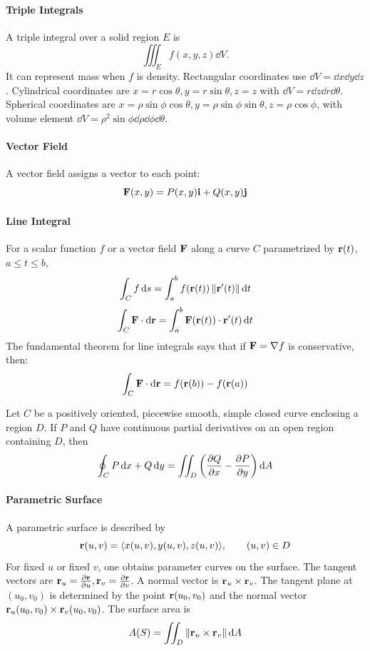 \documentclass[oneside]{book}
\begin{document}
\paragraph{Triple Integrals}

A triple integral over a solid region $E$ is
\[
    \iiint_E f(x,y,z)\dd V.
\]
It can represent mass when $f$ is density. Rectangular coordinates use
$
\dd V=\dd x\dd y\dd z
$.
Cylindrical coordinates are
$
    x=r\cos\theta,
    y=r\sin\theta,
    z=z
$
with
$\dd V=r\dd z\dd r\dd\theta$. Spherical coordinates are
$
    x=\rho\sin\phi\cos\theta,
    y=\rho\sin\phi\sin\theta,
    z=\rho\cos\phi
$,
with volume element
$
    \dd V=\rho^2\sin\phi\dd\rho\dd\phi\dd\theta
$.

\paragraph{Vector Field} A vector field assigns a vector to each point:
\[
    \mathbf{F}(x,y)=P(x,y)\mathbf{i}+Q(x,y)\mathbf{j}
\]

\paragraph{Line Integral}
For a scalar function $f$ or a vector field $\mathbf{F}$ along a curve $C$ parametrized by $\mathbf{r}(t)$, $a\leq t\leq b$,
\[
    \int_C f\mathop{}\!\mathrm{d} s=\int_a^b f(\mathbf{r}(t))\left\lVert \mathbf{r}'(t) \right\rVert\mathop{}\!\mathrm{d} t
\]
\[
    \int_C \mathbf{F}\cdot \mathop{}\!\mathrm{d} \mathbf{r}
    =\int_a^b \mathbf{F}(\mathbf{r}(t))\cdot \mathbf{r}'(t)\mathop{}\!\mathrm{d} t
\]
The fundamental theorem for line integrals says that if $\mathbf{F}=\nabla f$ is conservative, then:
\[
    \int_C \mathbf{F}\cdot \mathop{}\!\mathrm{d}\mathbf{r}=f(\mathbf{r}(b))-f(\mathbf{r}(a))
\]


\begin{theorem}
Let $C$ be a positively oriented, piecewise smooth, simple closed curve enclosing a region $D$. If $P$ and $Q$ have continuous partial derivatives on an open region containing $D$, then
\[
    \oint_C P\mathop{}\!\mathrm{d} x+Q\mathop{}\!\mathrm{d} y
    =\iint_D\left(\frac{\partial Q}{\partial x}-\frac{\partial P}{\partial y}\right)\mathop{}\!\mathrm{d} A
\]
\end{theorem}

\paragraph{Parametric Surface}

A parametric surface is described by
\[
    \mathbf{r}(u,v)=\langle x(u,v),y(u,v),z(u,v)\rangle,
    \qquad (u,v)\in D
\]
For fixed $u$ or fixed $v$, one obtains parameter curves on the surface. The tangent vectors are
$
    \mathbf{r}_u=\frac{\partial \mathbf{r}}{\partial u},
    \mathbf{r}_v=\frac{\partial \mathbf{r}}{\partial v}
$.
A normal vector is
$
    \mathbf{r}_u\times \mathbf{r}_v
$.
The tangent plane at $(u_0,v_0)$ is determined by the point $\mathbf{r}(u_0,v_0)$ and the normal vector
$
    \mathbf{r}_u(u_0,v_0)\times \mathbf{r}_v(u_0,v_0)
$. The surface area is
\[
    A(S)=\iint_D \left\lVert \mathbf{r}_u\times \mathbf{r}_v \right\rVert\mathop{}\!\mathrm{d} A
\]
\end{document}
